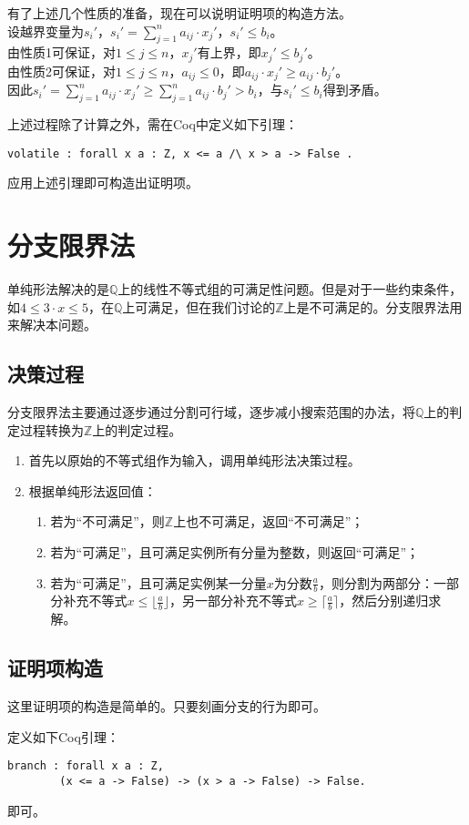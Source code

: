 有了上述几个性质的准备，现在可以说明证明项的构造方法。\\
设越界变量为$s_i'$，$s_i' = \sum_{j=1}^{n} a_{ij} \cdot x_j'$，$s_i' \leq b_i$。\\
由性质1可保证，对$1 \leq j \leq n$，$x_j'$有上界，即$x_j' \leq b_j'$。\\
由性质2可保证，对$1 \leq j \leq n$，$a_{ij} \leq 0$，即$a_{ij} \cdot x_j' \geq a_{ij} \cdot b_j'$。\\
因此$s_i' = \sum_{j=1}^{n} a_{ij} \cdot x_j' \geq \sum_{j=1}^{n} a_{ij} \cdot b_j' > b_i$，与$s_i' \leq b_i$得到矛盾。

上述过程除了计算之外，需在Coq中定义如下引理：
\begin{verbatim}
volatile : forall x a : Z, x <= a /\ x > a -> False .
\end{verbatim}
应用上述引理即可构造出证明项。

\section{分支限界法}
单纯形法解决的是$\mathbb{Q}$上的线性不等式组的可满足性问题。但是对于一些约束条件，如$4 \leq 3 \cdot x \leq 5$，在$\mathbb{Q}$上可满足，但在我们讨论的$\mathbb{Z}$上是不可满足的。分支限界法用来解决本问题。
\subsection{决策过程}
分支限界法主要通过逐步通过分割可行域，逐步减小搜索范围的办法，将$\mathbb{Q}$上的判定过程转换为$\mathbb{Z}$上的判定过程。
\begin{enumerate}
  \item 首先以原始的不等式组作为输入，调用单纯形法决策过程。
  \item 根据单纯形法返回值：
    \begin{enumerate}
      \item 若为``不可满足''，则$\mathbb{Z}$上也不可满足，返回``不可满足''；
      \item 若为``可满足''，且可满足实例所有分量为整数，则返回``可满足''；
      \item 若为``可满足''，且可满足实例某一分量$x$为分数$\frac{a}{b}$，则分割为两部分：一部分补充不等式$x \leq \lfloor \frac{a}{b} \rfloor$，另一部分补充不等式$x \geq \lceil \frac{a}{b} \rceil$，然后分别递归求解。
    \end{enumerate}
\end{enumerate}

\subsection{证明项构造}
这里证明项的构造是简单的。只要刻画分支的行为即可。

定义如下Coq引理：
\begin{verbatim}
branch : forall x a : Z,
        (x <= a -> False) -> (x > a -> False) -> False.
\end{verbatim}
即可。
